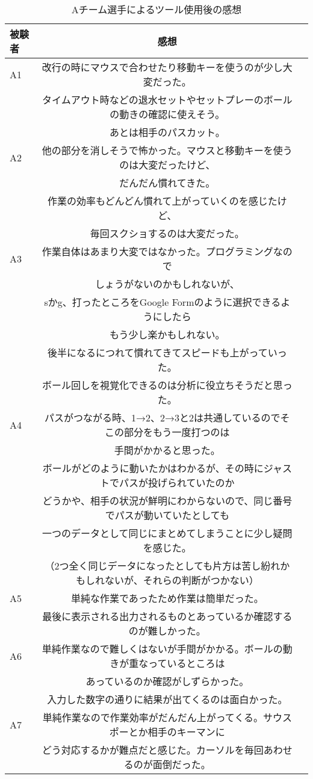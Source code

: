 \documentclass[../main.tex]{subfiles}
\begin{document}
\begin{table}[h]
  \caption{Aチーム選手によるツール使用後の感想}\label{table:青チームのツール使用者の感想}\centering
    \begin{tabular}{lcr}
    \hline \hline
    被験者 & 感想 \\
    \hline \hline
    A1 & 改行の時にマウスで合わせたり移動キーを使うのが少し大変だった。\\
    &タイムアウト時などの退水セットやセットプレーのボールの動きの確認に使えそう。 \\
    & あとは相手のパスカット。 \\
    A2 & 他の部分を消しそうで怖かった。マウスと移動キーを使うのは大変だったけど、 \\
    & だんだん慣れてきた。 \\
    & 作業の効率もどんどん慣れて上がっていくのを感じたけど、 \\
    & 毎回スクショするのは大変だった。 \\
    A3 & 作業自体はあまり大変ではなかった。プログラミングなので \\
    & しょうがないのかもしれないが、\\
    &sかg、打ったところをGoogle Formのように選択できるようにしたら \\
    & もう少し楽かもしれない。\\
    & 後半になるにつれて慣れてきてスピードも上がっていった。 \\
    & ボール回しを視覚化できるのは分析に役立ちそうだと思った。 \\
    A4 & パスがつながる時、1→2、2→3と2は共通しているのでそこの部分をもう一度打つのは \\
    & 手間がかかると思った。\\
    & ボールがどのように動いたかはわかるが、その時にジャストでパスが投げられていたのか \\
    & どうかや、相手の状況が鮮明にわからないので、同じ番号でパスが動いていたとしても \\
    & 一つのデータとして同じにまとめてしまうことに少し疑問を感じた。 \\
    &（2つ全く同じデータになったとしても片方は苦し紛れかもしれないが、それらの判断がつかない）\\
    A5 & 単純な作業であったため作業は簡単だった。\\
    &最後に表示される出力されるものとあっているか確認するのが難しかった。\\
    A6 & 単純作業なので難しくはないが手間がかかる。ボールの動きが重なっているところは \\
    & あっているのか確認がしずらかった。\\
    &入力した数字の通りに結果が出てくるのは面白かった。 \\
    A7 & 単純作業なので作業効率がだんだん上がってくる。サウスポーとか相手のキーマンに \\
    & どう対応するかが難点だと感じた。カーソルを毎回あわせるのが面倒だった。\\
    \hline
    \end{tabular}
  \end{table}
  
\end{document}
